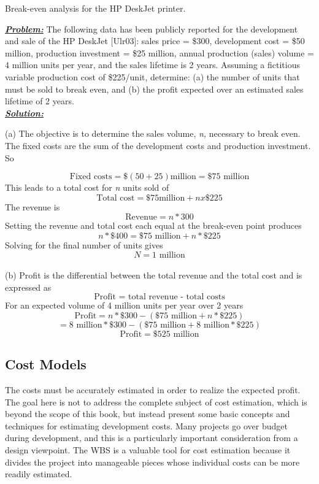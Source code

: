 \begin{example}{ Break-even analysis for the HP DeskJet printer.}
\label{example:projectManagementBreakEvenHpPrinter}

\emph{\textbf{\ul{Problem:}}} The following data has been publicly
reported for the development and sale of the HP DeskJet {[}Ulr03{]}:
sales price = \$300, development cost = \$50 million, production
investment = \$25 million, annual production (sales) volume = 4 million
units per year, and the sales lifetime is 2 years. Assuming a fictitious
variable production cost of \$225/unit, determine: (a) the number of
units that must be sold to break even, and (b) the profit expected over
an estimated sales lifetime of 2 years.\\

\emph{\textbf{\ul{Solution:}}}

(a) The objective is to determine the sales volume, \emph{n,} necessary
to break even. The fixed costs are the sum of the development costs and
production investment. So

$$\text{Fixed costs} = \$(50+25) \text{million} = \$75 \text{ million}$$
This leads to a total cost for \emph{n} units sold of
$$\text{Total cost} = \$75 \text{million} + n x \$225$$
The revenue is
$$\text{Revenue} = n * 300$$
Setting the revenue and total cost each equal at the break-even point
produces
$$n * \$400 = \$75 \text{ million} + n * \$225$$
Solving for the final number of units gives
$$N = 1 \text{ million}$$\\

(b) Profit is the differential between the total revenue and the total
cost and is expressed as
$$ \text{Profit = total revenue - total costs}$$
For an expected volume of 4 million units per year over 2 years
$$\text{Profit} = n * \$300 - (\$ 75 \text{ million} + n * \$225)$$
$$   = 8 \text{ million} * \$300 - (\$ 75 \text{ million} + 8 \text{ million} * \$225)$$
$$\text{Profit} = \$525 \text{ million}$$
\end{example}

\subsection{Cost Models}
\label{subsection:cost-models}

The costs must be accurately estimated in order to realize the expected
profit. The goal here is not to address the complete subject of cost
estimation, which is beyond the scope of this book, but instead present
some basic concepts and techniques for estimating development costs.
Many projects go over budget during development, and this is a
particularly important consideration from a design viewpoint. The WBS is
a valuable tool for cost estimation because it divides the project into
manageable pieces whose individual costs can be more readily estimated.

